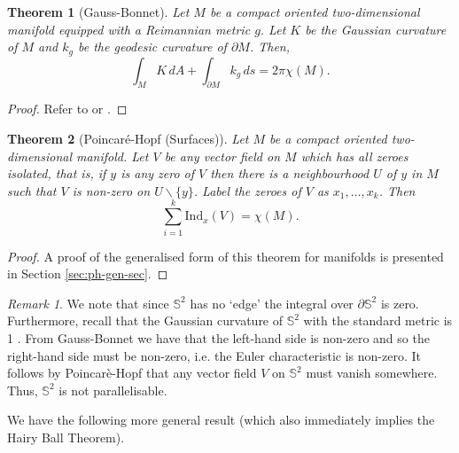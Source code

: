 \documentclass[12pt,a4paper]{article}
\numberwithin{equation}{section}
\newtheorem{theorem}{Theorem}[section]
\theoremstyle{definition}
\theoremstyle{remark}
\newtheorem{remark}{Remark}
\begin{document}
\begin{theorem}[Gauss-Bonnet]
Let $M$ be a compact oriented two-dimensional manifold equipped with a Reimannian metric $g$. Let $K$ be the Gaussian curvature of $M$ and $k_g$ be the geodesic curvature of $\partial M$. Then,
\[
\int_MK\,dA+\int_{\partial M}k_g\,ds=2\pi\chi(M).
\] 
\end{theorem}
\begin{proof}
Refer to \cite{andrews} or \cite{guillemin2010differential}.
\end{proof}
\begin{theorem}[Poincar\'{e}-Hopf (Surfaces)]
Let $M$ be a compact oriented two-dimensional manifold. Let $V$ be any vector field on $M$ which has all zeroes isolated, that is, if $y$ is any zero of $V$ then there is a neighbourhood $U$ of $y$ in $M$ such that $V$ is non-zero on $U\backslash\{y\}$. Label the zeroes of $V$ as $x_1,\ldots,x_k$. Then 
\[\sum_{i=1}^{k}\mathrm{Ind}_x(V)=\chi(M).\]
\label{thm:poinhopf}
\end{theorem}
\begin{proof}
A proof of the generalised form of this theorem for manifolds is presented in Section \ref{sec:ph-gen-sec}.
\end{proof}
%
\begin{remark}
We note that since $\mathbb{S}^2$ has no `edge' the integral over $\partial\mathbb{S}^2$ is zero. Furthermore, recall that the Gaussian curvature of $\mathbb{S}^2$ with the standard metric is 1 \cite{andrews}. From Gauss-Bonnet we have that the left-hand side is non-zero and so the right-hand side must be non-zero, i.e. the Euler characteristic is non-zero. It follows by Poincar\`{e}-Hopf that any vector field $V$ on $\mathbb{S}^2$ must vanish somewhere. Thus, $\mathbb{S}^2$ is not parallelisable. 
\end{remark} 
We have the following more general result (which also immediately implies the Hairy Ball Theorem).
\end{document}

